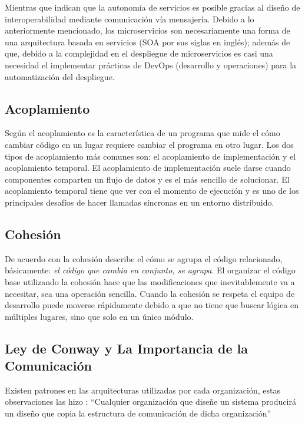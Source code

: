 Mientras que \cite{nadareishvili2016microservice} indican que la autonomía de servicios es posible
gracias al diseño de interoperabilidad mediante comunicación vía mensajería.
Debido a lo anteriormente mencionado, los microservicios son necesariamente una forma de una
arquitectura basada en servicios (SOA por sus siglas en inglés); además de que, debido a la
complejidad en el despliegue de microservicios es casi una necesidad el implementar prácticas de
DevOps (desarrollo y operaciones) para la automatización del despliegue.


\subsection{Acoplamiento}

Según \cite{newman2019monolith} el acoplamiento es la característica de un programa que mide el cómo
cambiar código en un lugar requiere cambiar el programa en otro lugar.
Los dos tipos de acoplamiento más comunes son: el acoplamiento de implementación y el acoplamiento temporal.
El acoplamiento de implementación suele darse cuando componentes comparten un flujo de datos y es el más
sencillo de solucionar.
El acoplamiento temporal tiene que ver con el momento de ejecución y es uno de los principales
desafíos de hacer llamadas síncronas en un entorno distribuido.


\subsection{Cohesión}

De acuerdo con \cite{newman2019monolith} la cohesión describe el cómo se agrupa el código relacionado,
básicamente: {\it el código que cambia en conjunto, se agrupa}.
El organizar el código base utilizando la cohesión hace que las modificaciones que inevitablemente
va a necesitar, sea una operación sencilla.
Cuando la cohesión se respeta el equipo de desarrollo puede moverse rápidamente debido a que no tiene
que buscar lógica en múltiples lugares, sino que solo en un único módulo.


\subsection{Ley de Conway y La Importancia de la Comunicación}

Existen patrones en las arquitecturas utilizadas por cada organización, estas observaciones
las hizo \cite{conway1968committees}: ``Cualquier organización que diseñe un sistema producirá
un diseño que copia la estructura de comunicación de dicha organización''


